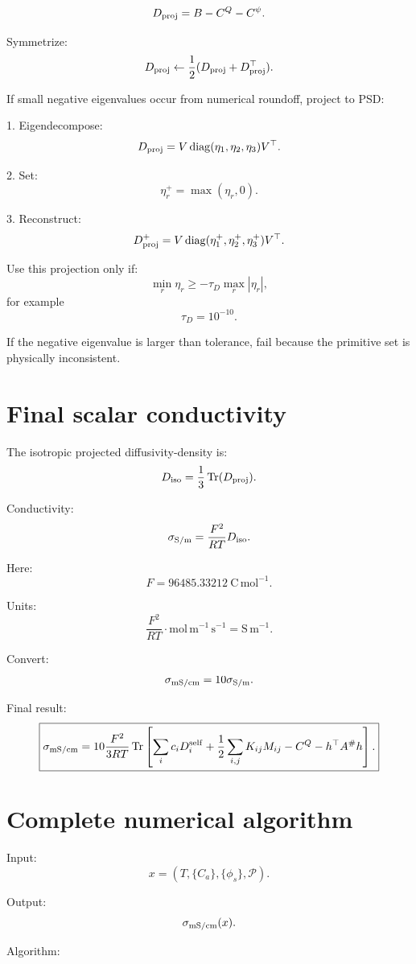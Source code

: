 \documentclass[11pt]{article}
\newcommand{\Tr}{\operatorname{Tr}}
\newcommand{\diag}{\operatorname{diag}}
\begin{document}
  \[
  D_{\rm proj}
  =
  B-C^Q-C^\psi.
  \]

  Symmetrize:
  \[
  D_{\rm proj}\leftarrow\frac12(D_{\rm proj}+D_{\rm proj}^{\top}).
  \]

  If small negative eigenvalues occur from numerical roundoff, project to PSD:

  1. Eigendecompose:
  \[
  D_{\rm proj}=V\diag(\eta_1,\eta_2,\eta_3)V^\top.
  \]

  2. Set:
  \[
  \eta_r^+=\max(\eta_r,0).
  \]

  3. Reconstruct:
  \[
  D_{\rm proj}^{+}=V\diag(\eta_1^+,\eta_2^+,\eta_3^+)V^\top.
  \]

  Use this projection only if:
  \[
  \min_r\eta_r\ge -\tau_D\max_r|\eta_r|,
  \]
  for example
  \[
  \tau_D=10^{-10}.
  \]

  If the negative eigenvalue is larger than tolerance, fail because the primitive
  set is physically inconsistent.

  \section{Final scalar conductivity}

  The isotropic projected diffusivity-density is:
  \[
  D_{\rm iso}
  =
  \frac13\Tr(D_{\rm proj}).
  \]

  Conductivity:
  \[
  \sigma_{\rm S/m}
  =
  \frac{F^2}{RT}D_{\rm iso}.
  \]

  Here:
  \[
  F=96485.33212\ \mathrm{C\,mol^{-1}}.
  \]

  Units:
  \[
  \frac{F^2}{RT}
  \cdot
  \mathrm{mol\,m^{-1}\,s^{-1}}
  =
  \mathrm{S\,m^{-1}}.
  \]

  Convert:
  \[
  \sigma_{\rm mS/cm}=10\sigma_{\rm S/m}.
  \]

  Final result:
  \[
  \boxed{
  \sigma_{\rm mS/cm}
  =
  10\frac{F^2}{3RT}
  \Tr
  \left[
  \sum_i c_iD_i^{\rm self}
  +
  \frac12\sum_{i,j}K_{ij}M_{ij}
  -
  C^Q
  -
  h^\top A^\#h
  \right].
  }
  \]

  \section{Complete numerical algorithm}

  Input:
  \[
  x=(T,\{C_a\},\{\phi_s\},\mathcal P).
  \]

  Output:
  \[
  \sigma_{\rm mS/cm}(x).
  \]

  Algorithm:
\end{document}
